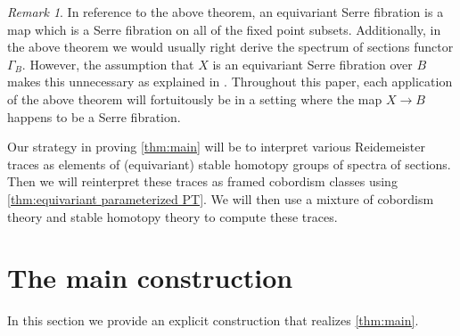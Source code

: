 \documentclass[11pt]{amsart}
\theoremstyle{plain}   %
\theoremstyle{definition}
\theoremstyle{remark}
\newtheorem{rmk}[thm]{Remark}
\numberwithin{equation}{section}
\begin{document}
\begin{rmk}
In reference to the above theorem, an equivariant Serre fibration is a map which is a Serre fibration on all of the fixed point subsets. Additionally, in the above theorem we would usually right derive the spectrum of sections functor $\Gamma_B$. However, the assumption that $X$ is an equivariant Serre fibration over $B$ makes this unnecessary as explained in \cite[Lemma 3.47]{williams_framed_PT}. Throughout this paper, each application of the above theorem will fortuitously be in a setting where the map $X\to B$ happens to be a Serre fibration. 
\end{rmk}

Our strategy in proving \cref{thm:main} will be to interpret various Reidemeister traces as elements of (equivariant) stable homotopy groups of spectra of sections. Then we will reinterpret these traces as framed cobordism classes using \cref{thm:equivariant parameterized PT}. We will then use a mixture of cobordism theory and stable homotopy theory to compute these traces.

\section{The main construction}

In this section we provide an explicit construction that realizes \cref{thm:main}.
\end{document}
